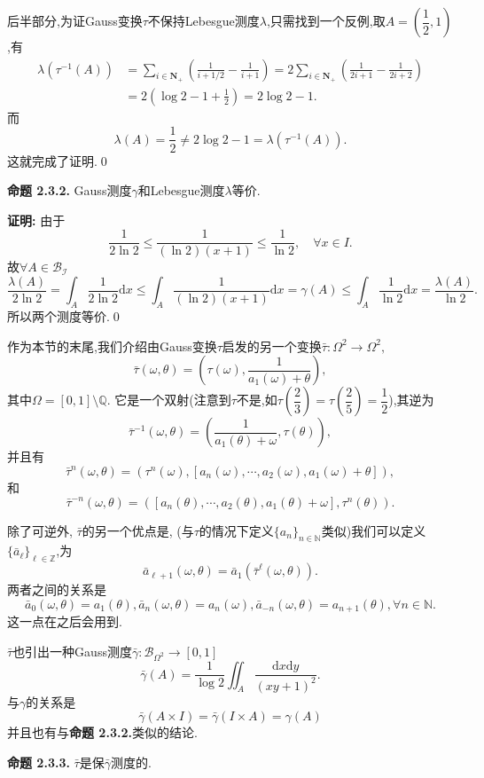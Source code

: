\par
后半部分,为证Gauss变换$\tau$不保持Lebesgue测度$\lambda$,只需找到一个反例,取$A=(\dfrac{1}{2},1)$,有
$$
    \begin{aligned}
        \lambda\left(\tau^{-1}\left(A\right)\right) & =\sum_{i\in\mathbf{N}_{+}}\left(\frac{1}{i+1/2}-\frac{1}{i+1}\right)=2\sum_{i\in\mathbf{N}_{+}}\left(\frac{1}{2i+1}-\frac{1}{2i+2}\right) \\
                                                    & =2\left(\log2-1+\frac12\right)=2\log2-1.
    \end{aligned}
$$
而
$$\lambda(A)=\frac{1}{2}\neq2\log2-1=\lambda\left(\tau^{-1}\left(A\right)\right).$$
这就完成了证明.\qed
\par
\textbf{命题 2.3.2.  }\textsuperscript{\cite{Liu_Peng}}
Gauss测度$\gamma$和Lebesgue测度$\lambda$等价.
\par
\textbf{证明:  }
由于
$$\frac{1}{2\ln2}\leqslant \frac{1}{(\ln2)(x+1)}\leqslant \frac{1}{\ln2},\quad \forall x\in I.$$
故$\forall A\in \mathcal{B_I}$
$$\frac{\lambda(A)}{2\ln2}=\int_A \frac{1}{2\ln2}\mathrm{d}x\leqslant \int_A\frac{1}{(\ln2)(x+1)}\mathrm{d}x=\gamma(A)\leqslant \int_A\frac{1}{\ln2}\mathrm{d}x=\frac{\lambda(A)}{\ln2}.$$
所以两个测度等价.\qed
\par
作为本节的末尾,我们介绍由Gauss变换$\tau$启发的另一个变换$\bar{\tau}:\Omega^2\to\Omega^2,$
$$\bar{\tau}\left(\omega,\theta\right)=\left(\tau\left(\omega\right),\frac{1}{a_1\left(\omega\right)+\theta}\right),$$
其中$\Omega=[0,1]\setminus\mathbb{Q}$.
它是一个双射(注意到$\tau$不是,如$\tau(\dfrac{2}{3})=\tau(\dfrac{2}{5})=\dfrac{1}{2}$),其逆为
$$\bar{\tau}^{-1}\left(\omega,\theta\right)=\left(\frac{1}{a_1\left(\theta\right)+\omega},\tau\left(\theta\right)\right),$$
并且有
$$\bar{\tau}^{n}\left(\omega,\theta\right)=\left(\tau^{n}\left(\omega\right),\left[a_{n}\left(\omega\right),\cdots,a_{2}\left(\omega\right),a_{1}\left(\omega\right)+\theta\right]\right),$$
和
$$\bar{\tau}^{-n}\left(\omega,\theta\right)=\left([a_{n}\left(\theta\right),\cdots,a_{2}\left(\theta\right),a_{1}\left(\theta\right)+\omega],\tau^{n}\left(\theta\right)\right).$$\par
除了可逆外, $\bar\tau$的另一个优点是, (与$\tau$的情况下定义$\{a_{n}\}_{n\in\mathbb{N}}$类似)我们可以定义$\{\bar{a}_{\ell}\}_{\ell\in\mathbb{Z}}$,为
$$\bar{a}_{\ell+1}\left(\omega,\theta\right)=\bar{a}_1\left(\bar{\tau}^\ell\left(\omega,\theta\right)\right).$$
两者之间的关系是
\begin{equation}\label{taubartauan}
    \bar{a}_{0}\left(\omega,\theta\right)=a_{1}\left(\theta\right),\bar{a}_{n}\left(\omega,\theta\right)=a_{n}\left(\omega\right),\bar{a}_{-n}\left(\omega,\theta\right)=a_{n+1}\left(\theta\right),\forall n\in\mathbb{N}.
\end{equation}
这一点在之后会用到.\par
$\bar\tau$也引出一种Gauss测度$\bar\gamma:\mathcal{B}_{\Omega^2}\to[0,1]$
$$\bar{\gamma}(A)=\frac{1}{\log2}\iint_A\frac{\mathrm{d}x\mathrm{d}y}{\left(xy+1\right)^2}.$$
与$\gamma$的关系是
$$\bar{\gamma}(A\times I) = \bar{\gamma}(I\times A) = \gamma(A)$$
并且也有与\textbf{命题 2.3.2.}类似的结论.\par
\textbf{命题 2.3.3.  }\textsuperscript{\cite{Iosifescu}}
$\bar\tau$是保$\bar\gamma$测度的.
\par
